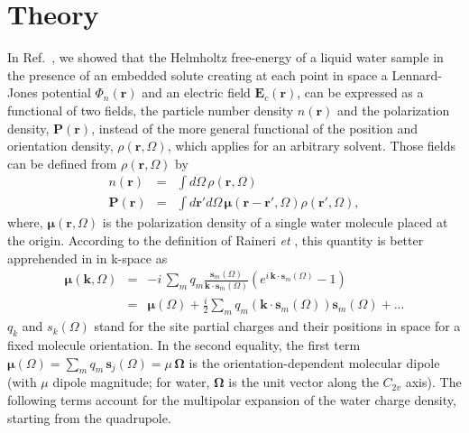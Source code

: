 \documentclass[aip,jcp,preprint]{revtex4-1}
\newcommand{\bea}{\begin{eqnarray}}
\newcommand{\eea}{\end{eqnarray}}
\newcommand{\rr}{\mathbf{r}}
\newcommand{\kk}{\mathbf{k}}
\newcommand{\rhorom}{{\rho\left({\mathbf r},\Omega\right)}}
\newcommand{\Om}{\mathbf{\Omega}}
\newcommand{\nr}{n(\mathbf{r})}
\newcommand{\Pol}{\mathbf{P}({\mathbf r})}
\newcommand{\MU}{\boldsymbol{\mu}}
\newcommand{\etal}{{\em et }}
\begin{document}
\section{Theory}

In Ref.~\cite{jeanmairet13}, we showed that the Helmholtz free-energy of a liquid water sample  in the presence of an embedded solute  creating at each point in space a Lennard-Jones potential
$\Phi_n(\rr)$ and an electric field  $\mathbf{E}_c(\rr)$, can be expressed as a functional of two fields, the particle number density $\nr$ and the polarization density, $\Pol$, instead of the more general functional of  the position and orientation density, $\rhorom$, which applies for an arbitrary solvent\cite{gendre09,zhao11,borgis12}. Those fields can be defined from $\rhorom$ by
\bea
\nr & = &\int d\Omega  \, \rhorom \\
 \Pol   & = & \int d\rr' d\Omega \, \MU(\rr-\rr', \Omega) \rho(\mathbf{r}',\Omega),
 \eea
where, $\MU(\rr,\Omega)$ is the polarization density of a single water molecule placed at the origin. According to the definition of Raineri \etal\cite{raineri93},  this quantity is better apprehended in
in k-space as 
\bea
\MU(\kk,\Omega) &= & -i \, \sum_m q_m \frac{\mathbf{s}_m(\Omega) }{\kk \cdot \mathbf{s}_m(\Omega) } \left( e^{i \, \kk \cdot \mathbf{s}_m(\Omega) } -1 \right) \\
\label{eq:mukom}
&= & \MU(\Omega) + \frac{i}{2} \sum_m q_m \left( \kk \cdot \mathbf{s}_m(\Omega) \right)  \mathbf{s}_m(\Omega) + ... 
\eea
$q_k$ and $s_k(\Omega)$ stand for the site partial charges and their positions in space for a fixed molecule orientation.
 In the second equality, the first term $\MU(\Omega) = \sum_m q_m \, \mathbf{s}_j(\Omega) =  \mu \, \Om$  is the orientation-dependent molecular dipole (with $\mu$  dipole magnitude; for water,
 $\Om$  is the unit vector along the $C_{2v}$ axis). The following terms account for the multipolar expansion of the water charge density, starting from the quadrupole. 
\end{document}
